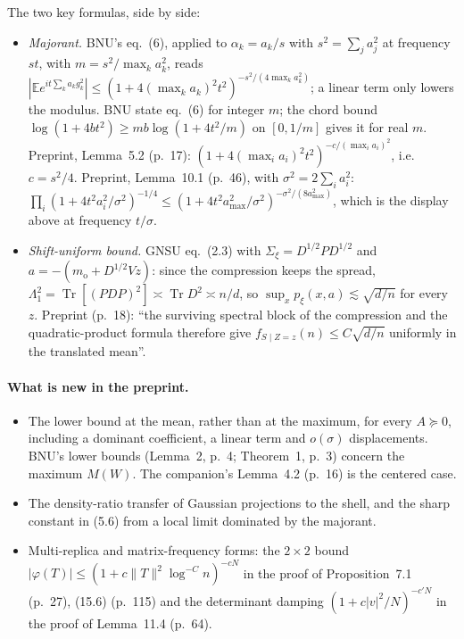 \documentclass[11pt]{article}
\newcommand{\E}{\mathbb{E}}
\DeclareMathOperator{\Tr}{Tr}
\newcommand{\norm}[1]{\lVert #1\rVert}
\newcommand{\ploc}[2]{#1}
\begin{document}
The two key formulas, side by side:
\begin{itemize}
\item \emph{Majorant.} BNU's eq.~(6), applied to $\alpha_k=a_k/s$ with
 $s^2=\sum_ja_j^2$ at frequency $st$, with $m=s^2/\max_ka_k^2$, reads
 $|\E e^{it\sum_ka_kg_k^2}|\le(1+4(\max_ka_k)^2t^2)^{-s^2/(4\max_ka_k^2)}$;
 a linear term only lowers the modulus. BNU state eq.~(6) for integer $m$;
 the chord bound $\log(1+4bt^2)\ge mb\log(1+4t^2/m)$ on $[0,1/m]$ gives it for
 real $m$. Preprint, Lemma~5.2 \ploc{(p.~17)}{profile-spectral.tex:423--427}:
 $(1+4(\max_ia_i)^2t^2)^{-c/(\max_ia_i)^2}$, i.e.\ $c=s^2/4$. Preprint,
 Lemma~10.1 \ploc{(p.~46)}{profile-orbits.tex:325--331}, with
 $\sigma^2=2\sum_ia_i^2$:
 $\prod_i(1+4t^2a_i^2/\sigma^2)^{-1/4}\le(1+4t^2a_{\max}^2/\sigma^2)^{-\sigma^2/(8a_{\max}^2)}$,
 which is the display above at frequency $t/\sigma$.
\item \emph{Shift-uniform bound.} GNSU eq.~(2.3) with
 $\Sigma_\xi=D^{1/2}PD^{1/2}$ and $a=-(m_{\mathrm o}+D^{1/2}Vz)$: since
 the compression keeps the spread,
 $\Lambda_1^2=\Tr[(PDP)^2]\asymp\Tr D^2\asymp n/d$, so
 $\sup_xp_\xi(x,a)\lesssim\sqrt{d/n}$ for every $z$. Preprint
 \ploc{(p.~18)}{profile-spectral.tex:454--456}: ``the surviving spectral block
 of the compression and the quadratic-product formula therefore give
 $f_{S\mid Z=z}(n)\le C\sqrt{d/n}$ uniformly in the translated mean''.
\end{itemize}

\paragraph{What is new in the preprint.}
\begin{itemize}
\item The lower bound at the mean, rather than at the maximum, for every
 $A\succeq0$, including a dominant coefficient, a linear term and $o(\sigma)$
 displacements. BNU's lower bounds (Lemma~2, p.~4; Theorem~1, p.~3) concern the
 maximum $M(W)$. The companion's
 \ploc{Lemma~4.2 (p.~16)}{AcceptedCritical spherical.tex:154--165} is the
 centered case.
\item The density-ratio transfer of Gaussian projections to the shell, and the
 sharp constant in (5.6) from a local limit dominated by the majorant.
\item Multi-replica and matrix-frequency forms: the $2\times2$ bound
 $|\varphi(T)|\le(1+c\norm T^2\log^{-C}n)^{-cN}$ in the proof of
 \ploc{Proposition~7.1 (p.~27)}{profile-spectral.tex:1202--1208},
 \ploc{(15.6) (p.~115)}{cap-static.tex:181--206} and the determinant damping
 $(1+c|v|^2/N)^{-c'N}$ in the proof of
 \ploc{Lemma~11.4 (p.~64)}{profile-local.tex:1113--1123}.
\end{itemize}
\end{document}
